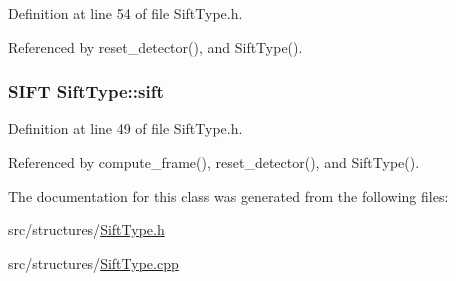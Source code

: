 \-Definition at line 54 of file \-Sift\-Type.\-h.



\-Referenced by reset\-\_\-detector(), and \-Sift\-Type().

\hypertarget{class_sift_type_a85fc34654bce309e88865979e2076eb3}{
\subsubsection[{sift}]{\setlength{\rightskip}{0pt plus 5cm}\-S\-I\-F\-T {\bf \-Sift\-Type\-::sift}}}
\label{class_sift_type_a85fc34654bce309e88865979e2076eb3}


\-Definition at line 49 of file \-Sift\-Type.\-h.



\-Referenced by compute\-\_\-frame(), reset\-\_\-detector(), and \-Sift\-Type().



\-The documentation for this class was generated from the following files\-:\begin{DoxyCompactItemize}
\item 
src/structures/\hyperlink{_sift_type_8h}{\-Sift\-Type.\-h}\item 
src/structures/\hyperlink{_sift_type_8cpp}{\-Sift\-Type.\-cpp}\end{DoxyCompactItemize}
